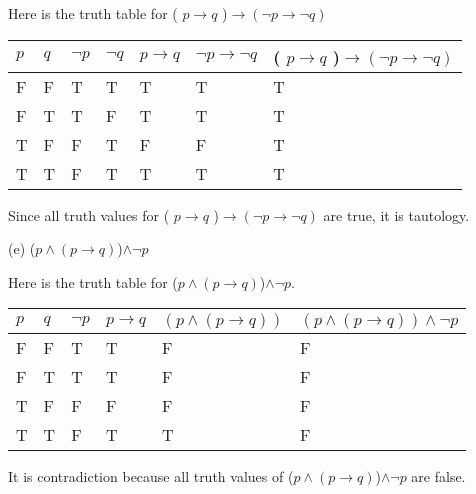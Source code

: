\documentclass{article}
\begin{document}
Here is the truth table for ( $p \rightarrow q$ )$ \rightarrow (\neg p \rightarrow \neg q )$

\begin{tabular}{ll|l|l|l|l|l}
  $p$ & $q$ & $\neg p$ & $\neg q$ & $p \rightarrow q$ & $\neg p \rightarrow \neg q$  & ( $p \rightarrow q$ )$ \rightarrow (\neg p \rightarrow \neg q )$\\
  \hline
  F & F & T & T & T & T & T \\
  F & T & T & F & T & T & T \\
  T & F & F & T & F & F & T\\
  T & T & F & T & T & T & T
 
\end{tabular}
  
  Since all truth values for ( $p \rightarrow q$ )$ \rightarrow (\neg p \rightarrow \neg q )$ are true, it is tautology.
  
(e)  ($p \wedge (p \rightarrow q )$)$ \wedge \neg p$

Here is the truth table for ($p \wedge (p \rightarrow q )$)$ \wedge \neg p$.

\begin{tabular}{ll|l|l|l|l}
  $p$ & $q$ & $\neg p$ & $p \rightarrow q$ & $(p \wedge (p \rightarrow q ))$ & $(p \wedge (p \rightarrow q )) \wedge \neg p$\\
  \hline
  F & F & T & T & F & F \\
  F & T & T & T & F & F \\
  T & F & F & F & F & F \\
  T & T & F & T & T & F
 
\end{tabular}

It is contradiction because all truth values of ($p \wedge (p \rightarrow q )$)$ \wedge \neg p$ are false. 

  
\end{document}
